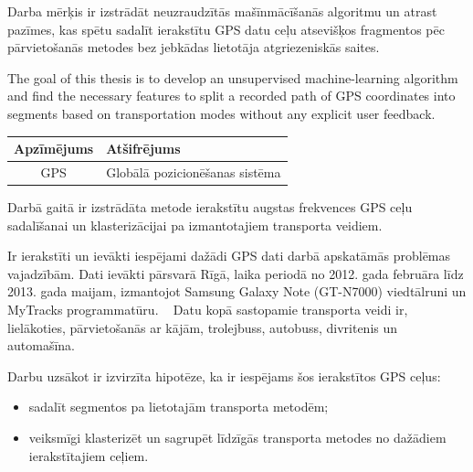 \documentclass{ludis}
\begin{document}
\maketitle

\begin{abstract-lv}
  Darba mērķis ir izstrādāt neuzraudzītās mašīnmācīšanās algoritmu un atrast pazīmes, kas spētu
  sadalīt ierakstītu GPS datu ceļu atsevišķos fragmentos pēc pārvietošanās metodes bez jebkādas 
  lietotāja atgriezeniskās saites.
\end{abstract-lv}

\begin{abstract-en}
  The goal of this thesis is to develop an unsupervised machine-learning algo\-rithm and find the 
  necessary features to split a recorded path of GPS coordi\-nates into segments based on
  transportation modes without any explicit user feedback.
\end{abstract-en}

\tableofcontents

\setlength\LTleft{0pt}
\setlength\LTright{0pt}
\begin{longtable}{| c | p{28em} |}
  \hline
  \textbf{Apzīmējums} & \textbf{Atšifrējums}\\ 
  \endhead
  \hline
  GPS & Globālā pozicionēšanas sistēma\\
  \hline
\end{longtable}

Darbā gaitā ir izstrādāta metode ierakstītu augstas frekvences GPS ceļu sadalīšanai un 
klasterizācijai pa izmantotajiem transporta veidiem. 

Ir ierakstīti un ievākti iespējami dažādi GPS dati darbā apskatāmās prob\-lēmas vajadzībām. Dati
ievākti pārsvarā Rīgā, laika periodā no 2012. gada februāra līdz 2013. gada maijam, izmantojot Samsung
Galaxy Note (GT-N7000) viedtālruni un MyTracks programmatūru. ~\cite{mytracks} Datu kopā sastopamie
transporta veidi ir, lielākoties, pārvietošanās ar kājām, trolejbuss, autobuss, divritenis un 
automašīna.

Darbu uzsākot ir izvirzīta hipotēze, ka ir iespējams šos ierakstītos GPS ceļus:
\begin{itemize}
\item sadalīt segmentos pa lietotajām transporta metodēm;
\item veiksmīgi klasterizēt un sagrupēt līdzīgās transporta metodes no dažā\-diem ierakstītajiem ceļiem.
\end{itemize}
\end{document}
